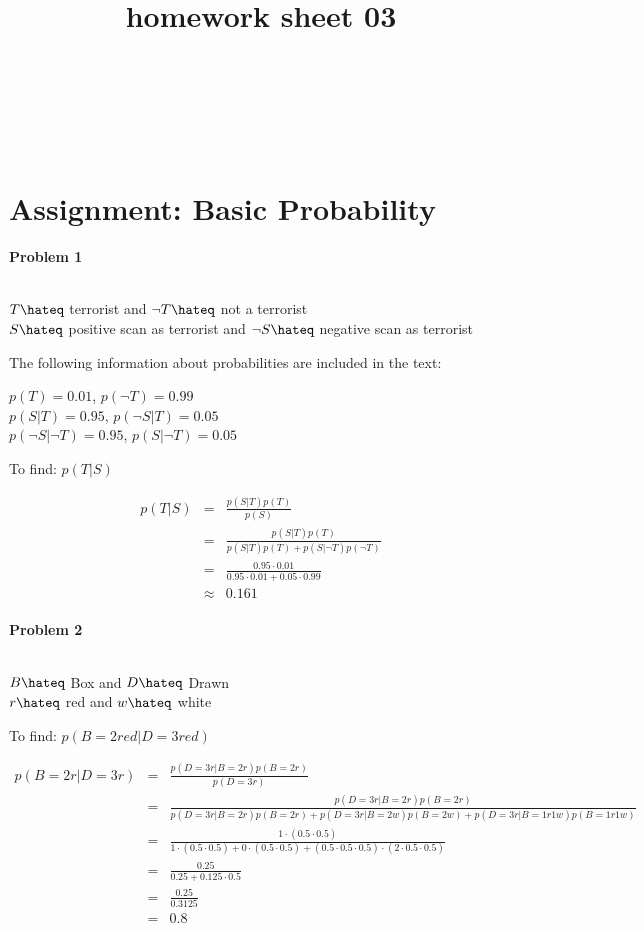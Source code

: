 \documentclass{article}
\title{homework sheet 03}
\author{
\name{Andre Seitz}\\
\imat{03622870}\\
\email{andre.seitz@mytum.de}
\And
\name{Linda Leidig} \\
\imat{03608416}\\
\email{linda.leidig@tum.de}
}
\begin{document}
\maketitle

\section{Assignment: Basic Probability}
\paragraph*{Problem 1}
$\;$ 

$T \hateq $ terrorist and $\neg T \hateq $ not a terrorist\\
$S \hateq $ positive scan as terrorist and $\neg S \hateq $ negative scan as terrorist

The following information about probabilities are included in the text:

$p(T) = 0.01$, $p(\neg T) = 0.99$\\
$p(S|T) = 0.95$, $p(\neg S|T) = 0.05$\\
$p(\neg S|\neg T) = 0.95$, $p(S|\neg T) = 0.05$

To find: $p(T|S)$

\begin{eqnarray}
p(T|S)&=&\frac{p(S|T)p(T)}{p(S)}\\
&=&\frac{p(S|T)p(T)}{p(S|T)p(T)+p(S|\neg T)p(\neg T)}\\
&=&\frac{0.95\cdot 0.01}{0.95\cdot 0.01 + 0.05 \cdot 0.99}\\
&\approx & 0.161 
\end{eqnarray}


\paragraph*{Problem 2}
$\;$ 

$B \hateq $ Box and $D \hateq $ Drawn\\
$r \hateq $ red and $w \hateq $ white

To find: $p(B = 2red|D = 3 red)$

\begin{eqnarray}
p(B = 2r|D = 3r) &=& \frac{p(D = 3r |B = 2r)p(B = 2r)}{p(D = 3r)}\\
&=&\frac{p(D = 3r |B = 2r)p(B = 2r)}{p(D = 3r|B = 2r)p(B = 2r)+p(D = 3r|B = 2w)p(B = 2w)+ p(D = 3r|B = 1r1w)p(B = 1r1w)}\\
&=&\frac{1\cdot (0.5 \cdot 0.5)}{1\cdot (0.5 \cdot 0.5) + 0 \cdot (0.5 \cdot 0.5) + (0.5 \cdot 0.5 \cdot 0.5) \cdot (2 \cdot 0.5 \cdot 0.5)}\\
&=&\frac{0.25}{0.25 + 0.125 \cdot 0.5}\\
&=& \frac{0.25}{0.3125}\\
&=& 0.8
\end{eqnarray}
\end{document}

